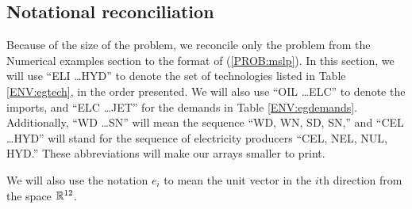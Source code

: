 \subsection{Notational reconciliation}
Because of the size of the problem, we reconcile only the problem from the Numerical examples section to the format of (\ref{PROB:mslp}).  In this section, we will use ``ELI \ldots HYD'' to denote the set of technologies listed in Table \ref{ENV:egtech}, in the order presented.  We will also use ``OIL \ldots ELC'' to denote the imports, and ``ELC \ldots JET'' for the demands in Table \ref{ENV:egdemands}.  Additionally, ``WD \ldots SN'' will mean the sequence ``WD, WN, SD, SN,'' and ``CEL \ldots HYD'' will stand for the sequence of electricity producers ``CEL, NEL, NUL, HYD.''  These abbreviations will make our arrays smaller to print.

We will also use the notation $e_i$ to mean the unit vector in the $i\text{th}$ direction from the space ${\mathbb R}^{12}$.

